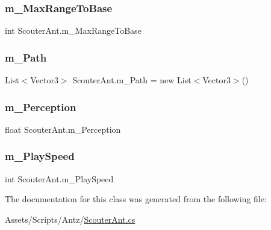 \mbox{\label{class_scouter_ant_ae9b4fd2ec2130fb05fd8bbd0210ab5b7}} 
\subsubsection{\texorpdfstring{m\_MaxRangeToBase}{m\_MaxRangeToBase}}
{\footnotesize\ttfamily int Scouter\+Ant.\+m\+\_\+\+Max\+Range\+To\+Base}

\mbox{\label{class_scouter_ant_a1e85f3293ccd5e8db2f7390501f251c8}} 
\subsubsection{\texorpdfstring{m\_Path}{m\_Path}}
{\footnotesize\ttfamily List$<$Vector3$>$ Scouter\+Ant.\+m\+\_\+\+Path = new List$<$Vector3$>$()}

\mbox{\label{class_scouter_ant_a61a72077d3d00a3e9d9cbceb1b2a6c13}} 
\subsubsection{\texorpdfstring{m\_Perception}{m\_Perception}}
{\footnotesize\ttfamily float Scouter\+Ant.\+m\+\_\+\+Perception}

\mbox{\label{class_scouter_ant_af358799b1539611777fb416c823b7d00}} 
\subsubsection{\texorpdfstring{m\_PlaySpeed}{m\_PlaySpeed}}
{\footnotesize\ttfamily int Scouter\+Ant.\+m\+\_\+\+Play\+Speed}



The documentation for this class was generated from the following file\+:\begin{DoxyCompactItemize}
\item 
Assets/\+Scripts/\+Antz/\mbox{\hyperlink{_scouter_ant_8cs}{Scouter\+Ant.\+cs}}\end{DoxyCompactItemize}
